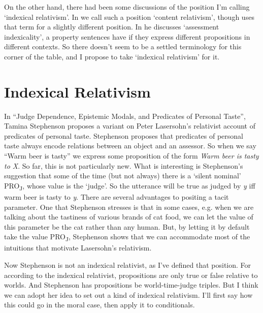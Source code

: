 On the other hand, there had been some discussions of the position I'm calling `indexical relativism'. In \cite{Egan2005-EGAEMI} we call such a position `content relativism', though \cite{Cappelen2008} uses that term for a slightly different position. In \cite{MacFarlane2005-MACMSO} he discusses `assessment indexicality', a property sentences have if they express different propositions in different contexts. So there doesn't seem to be a settled terminology for this corner of the table, and I propose to take `indexical relativism' for it.


\section{Indexical Relativism}

In ``Judge Dependence, Epistemic Modals, and Predicates of Personal Taste'', Tamina Stephenson proposes a variant on Peter Lasersohn's \citeyearpar{Lasersohn2005} relativist account of predicates of personal taste. Stephenson proposes that predicates of personal taste always encode relations between an object and an assessor. So when we say ``Warm beer is tasty'' we express some proposition of the form \textit{Warm beer is tasty to X}. So far, this is not particularly new. What is interesting is Stephenson's suggestion that some of the time (but not always) there is a `silent nominal' PRO\textsubscript{J}, whose value is the `judge'. So the utterance will be true as judged by \textit{y} iff warm beer is tasty to \textit{y}. There are several advantages to positing a tacit parameter. One that Stephenson stresses is that in some cases, e.g. when we are talking about the tastiness of various brands of cat food, we can let the value of this parameter be the cat rather than any human. But, by letting it by default take the value PRO\textsubscript{J}, Stephenson shows that we can accommodate most of the intuitions that motivate Lasersohn's relativism.

Now Stephenson is not an indexical relativist, as I've defined that position. For according to the indexical relativist, propositions are only true or false relative to worlds. And Stephenson has propositions be world-time-judge triples. But I think we can adopt her idea to set out a kind of indexical relativism. I'll first say how this could go in the moral case, then apply it to conditionals.


